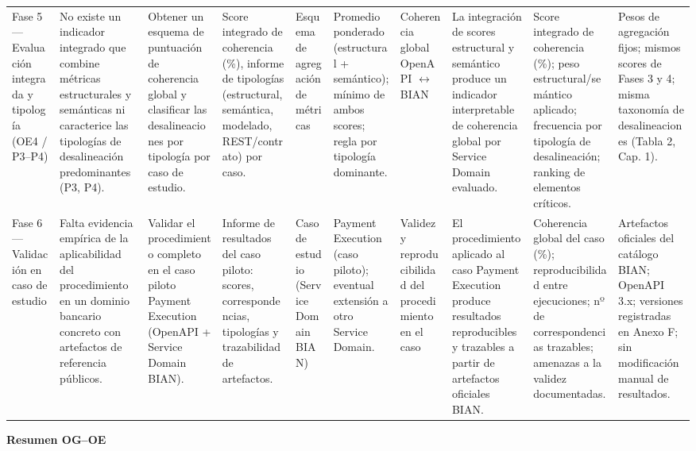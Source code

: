\documentclass[10pt,landscape]{article}
\begin{document}
\begin{longtable}{@{} P{0.094\textwidth} P{0.094\textwidth} P{0.094\textwidth} P{0.094\textwidth} P{0.094\textwidth} P{0.094\textwidth} P{0.094\textwidth} P{0.094\textwidth} P{0.094\textwidth} P{0.094\textwidth} @{}}
Fase 5 — Evaluación integrada y tipología (OE4 / P3–P4) & No existe un indicador integrado que combine métricas estructurales y semánticas ni caracterice las tipologías de desalineación predominantes (P3, P4). & Obtener un esquema de puntuación de coherencia global y clasificar las desalineaciones por tipología por caso de estudio. & Score integrado de coherencia (\%), informe de tipologías (estructural, semántica, modelado, REST/contrato) por caso. & Esquema de agregación de métricas & Promedio ponderado (estructural + semántico); mínimo de ambos scores; regla por tipología dominante. & Coherencia global OpenAPI $\leftrightarrow$ BIAN & La integración de scores estructural y semántico produce un indicador interpretable de coherencia global por Service Domain evaluado. & Score integrado de coherencia (\%); peso estructural/semántico aplicado; frecuencia por tipología de desalineación; ranking de elementos críticos. & Pesos de agregación fijos; mismos scores de Fases 3 y 4; misma taxonomía de desalineaciones (Tabla 2, Cap. 1). \\
 Fase 6 — Validación en caso de estudio & Falta evidencia empírica de la aplicabilidad del procedimiento en un dominio bancario concreto con artefactos de referencia públicos. & Validar el procedimiento completo en el caso piloto Payment Execution (OpenAPI + Service Domain BIAN). & Informe de resultados del caso piloto: scores, correspondencias, tipologías y trazabilidad de artefactos. & Caso de estudio (Service Domain BIAN) & Payment Execution (caso piloto); eventual extensión a otro Service Domain. & Validez y reproducibilidad del procedimiento en el caso & El procedimiento aplicado al caso Payment Execution produce resultados reproducibles y trazables a partir de artefactos oficiales BIAN. & Coherencia global del caso (\%); reproducibilidad entre ejecuciones; nº de correspondencias trazables; amenazas a la validez documentadas. & Artefactos oficiales del catálogo BIAN; OpenAPI 3.x; versiones registradas en Anexo F; sin modificación manual de resultados. \\
\end{longtable}
\normalsize
\newpage
\begin{center}{\Large\bfseries Resumen OG--OE}\end{center}
\vspace{0.5em}
\small
\end{document}
